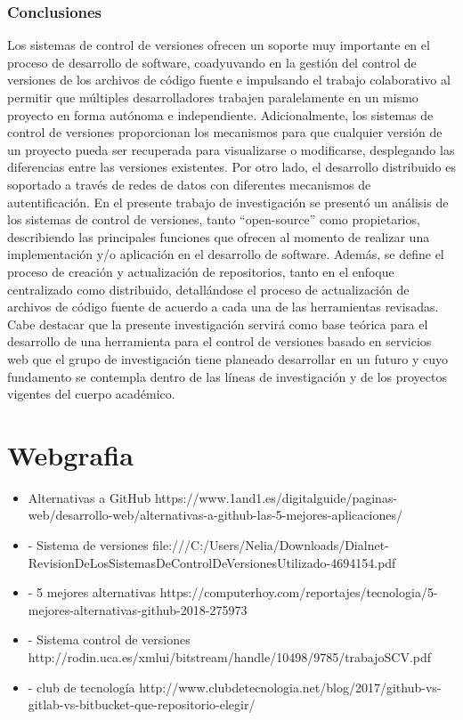 \documentclass[12pt,letterpaper]{article}
\begin{document}
\section{Conclusiones}
Los sistemas de control de versiones ofrecen un soporte muy importante en el proceso de desarrollo de software, coadyuvando en la gestión del control de versiones de los archivos de código fuente e impulsando el trabajo colaborativo al permitir que múltiples desarrolladores trabajen paralelamente en un mismo proyecto en forma autónoma e independiente. Adicionalmente, los sistemas de control de versiones proporcionan los mecanismos para que cualquier versión de un proyecto pueda ser recuperada para visualizarse o modificarse, desplegando las diferencias entre las versiones existentes. Por otro lado, el desarrollo distribuido es soportado a través de redes de datos con diferentes mecanismos de autentificación. En el presente trabajo de investigación se presentó un análisis de los sistemas de control de versiones, tanto “open-source” como propietarios, describiendo las principales funciones que ofrecen al momento de realizar una implementación y/o aplicación en el desarrollo de software. Además, se define el proceso de creación y actualización de repositorios, tanto en el enfoque centralizado como distribuido, detallándose el proceso de actualización de archivos de código fuente de acuerdo a cada una de las herramientas revisadas. Cabe destacar que la presente investigación servirá como base teórica para el desarrollo de una herramienta para el control de versiones basado en servicios web que el grupo de investigación tiene planeado desarrollar en un futuro y cuyo fundamento se contempla dentro de las líneas de investigación y de los proyectos vigentes del cuerpo académico.

\part{ Webgrafia}
\begin{itemize}
\item Alternativas a GitHub 
https://www.1and1.es/digitalguide/paginas-web/desarrollo-web/alternativas-a-github-las-5-mejores-aplicaciones/

\item -	Sistema de versiones  
file:///C:/Users/Nelia/Downloads/Dialnet-RevisionDeLosSistemasDeControlDeVersionesUtilizado-4694154.pdf 

\item -	5 mejores alternativas 
 https://computerhoy.com/reportajes/tecnologia/5-mejores-alternativas-github-2018-275973

\item -	Sistema control de versiones 
http://rodin.uca.es/xmlui/bitstream/handle/10498/9785/trabajoSCV.pdf 

\item -	club de tecnología 
http://www.clubdetecnologia.net/blog/2017/github-vs-gitlab-vs-bitbucket-que-repositorio-elegir/ 

\end{itemize}
\end{document}
